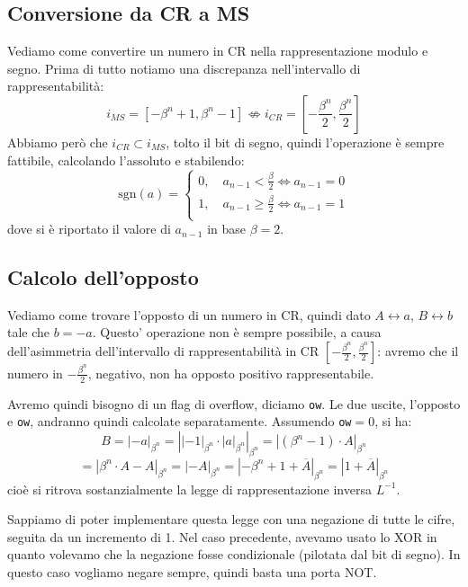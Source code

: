 \documentclass[a4paper,11pt]{article}
\begin{document}
\subsection{Conversione da CR a MS}
Vediamo come convertire un numero in CR nella rappresentazione modulo e segno.
Prima di tutto notiamo una discrepanza nell'intervallo di rappresentabilità:
$$
i_{MS} = [-\beta^n + 1, \beta^n - 1] \not\Leftrightarrow i_{CR} = \left[-\frac{\beta^n}{2}, \frac{\beta^n}{2}\right]
$$
Abbiamo però che $i_{CR} \subset i_{MS}$, tolto il bit di segno, quindi l'operazione è sempre fattibile, calcolando l'assoluto e stabilendo:
$$
\mathrm{sgn}(a) = 
	\begin{cases}
		0, \quad a_{n-1} < \frac{\beta}{2} \Leftrightarrow a_{n-1} = 0 \\ 
		1, \quad a_{n-1} \geq \frac{\beta}{2} \Leftrightarrow a_{n-1} = 1 \\ 
	\end{cases}
$$
dove si è riportato il valore di $a_{n-1}$ in base $\beta = 2$.

\subsection{Calcolo dell'opposto}
Vediamo come trovare l'opposto di un numero in CR, quindi dato $A \leftrightarrow a$, $B \leftrightarrow b$ tale che $ b = -a$.
Questo' operazione non è sempre possibile, a causa dell'asimmetria dell'intervallo di rappresentabilità in CR $\left[-\frac{\beta^n}{2}, \frac{\beta^n}{2}\right]$: avremo che il numero in $-\frac{\beta^n}{2}$, negativo, non ha opposto positivo rappresentabile.

Avremo quindi bisogno di un flag di overflow, diciamo \lstinline|ow|.
Le due uscite, l'opposto e \lstinline|ow|, andranno quindi calcolate separatamente.
Assumendo \lstinline|ow|$=0$, si ha:
$$
B = |-a|_{\beta^n} = \left||-1|_{\beta^n} \cdot |a|_{\beta^n} \right|_{\beta^n} = |(\beta^n - 1) \cdot A|_{\beta^n}
$$
$$
= |\beta^n \cdot A - A |_{\beta^n} = |-A|_{\beta^n} = |-\beta^n + 1 + \overline{A}|_{\beta^n} = |1 + \overline{A}|_{\beta^n}
$$
cioè si ritrova sostanzialmente la legge di rappresentazione inversa $L^{-1}$.

Sappiamo di poter implementare questa legge con una negazione di tutte le cifre, seguita da un incremento di 1.
Nel caso precedente, avevamo usato lo XOR in quanto volevamo che la negazione fosse condizionale (pilotata dal bit di segno).
In questo caso vogliamo negare sempre, quindi basta una porta NOT.
\end{document}
